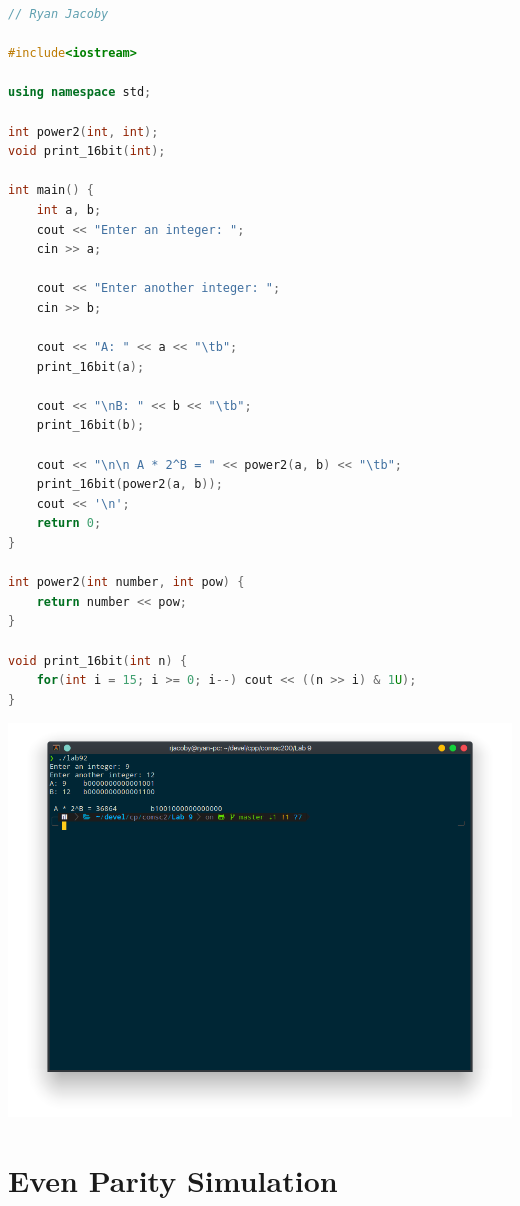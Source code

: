 \documentclass[letterpaper, 11pt]{article}
\begin{document}
\begin{lstlisting}[language=c++, caption=main.cpp]
// Ryan Jacoby

#include<iostream>

using namespace std;

int power2(int, int);
void print_16bit(int);

int main() {
    int a, b;
    cout << "Enter an integer: ";
    cin >> a;

    cout << "Enter another integer: ";
    cin >> b;

    cout << "A: " << a << "\tb";
    print_16bit(a);

    cout << "\nB: " << b << "\tb";
    print_16bit(b);

    cout << "\n\n A * 2^B = " << power2(a, b) << "\tb";
    print_16bit(power2(a, b));
    cout << '\n';
    return 0;
}

int power2(int number, int pow) {
    return number << pow;
}

void print_16bit(int n) {
    for(int i = 15; i >= 0; i--) cout << ((n >> i) & 1U);
}
\end{lstlisting}

\includegraphics[scale=0.5]{pow.png}

\section{Even Parity Simulation}
\end{document}
